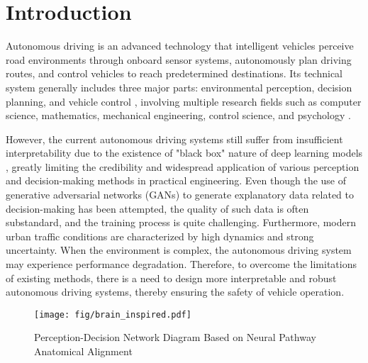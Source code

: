 \section{Introduction}
\label{sec:intro}
\hspace{1pc}Autonomous driving \cite{urmson2008autonomous} is an advanced technology that intelligent vehicles perceive road environments through onboard sensor systems, autonomously plan driving routes, and control vehicles to reach predetermined destinations. 
Its technical system generally includes three major parts: environmental perception, decision planning, and vehicle control \cite{amini2020learning, montemerlo2008junior}, involving multiple research fields such as computer science, mathematics, mechanical engineering, control science, and psychology \cite{chen2015deepdriving}.


However, the current autonomous driving systems still suffer from insufficient interpretability due to the existence of "black box" nature of deep learning models \cite{7979332}, greatly limiting the credibility and widespread application of various perception and decision-making methods in practical engineering. 
Even though the use of generative adversarial networks (GANs) \cite{zugner2020adversarial} to generate explanatory data related to decision-making has been attempted, the quality of such data is often substandard, and the training process is quite challenging. 
Furthermore, modern urban traffic conditions are characterized by high dynamics and strong uncertainty. 
When the environment is complex, the autonomous driving system may experience performance degradation. 
Therefore, to overcome the limitations of existing methods, there is a need to design more interpretable and robust autonomous driving systems, thereby ensuring the safety of vehicle operation.
\begin{figure}[t]
	\centering
	\texttt{[image: fig/brain\_inspired.pdf]}
	
	\caption{Perception-Decision Network Diagram Based on Neural Pathway Anatomical Alignment}
	\label{fig:fig1}
\end{figure}

